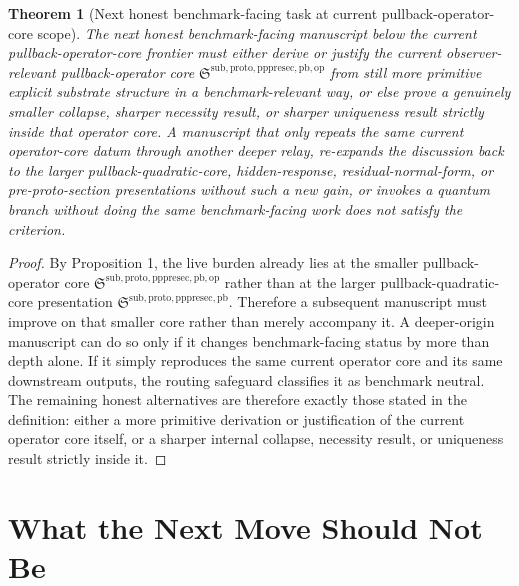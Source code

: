 \documentclass[11pt]{article}
\newcommand{\PrePreProtoSectionPullbackCore}{\mathfrak S^{\mathrm{sub,proto,pppresec,pb}}}
\newcommand{\PullbackOperatorCore}{\mathfrak S^{\mathrm{sub,proto,pppresec,pb,op}}}
\newtheorem{theorem}{Theorem}
\begin{document}
\begin{theorem}[Next honest benchmark-facing task at current pullback-operator-core scope]
The next honest benchmark-facing manuscript below the current pullback-operator-core frontier must either derive or justify the current observer-relevant pullback-operator core \(\PullbackOperatorCore\) from still more primitive explicit substrate structure in a benchmark-relevant way, or else prove a genuinely smaller collapse, sharper necessity result, or sharper uniqueness result strictly inside that operator core. A manuscript that only repeats the same current operator-core datum through another deeper relay, re-expands the discussion back to the larger pullback-quadratic-core, hidden-response, residual-normal-form, or pre-proto-section presentations without such a new gain, or invokes a quantum branch without doing the same benchmark-facing work does not satisfy the criterion.
\end{theorem}

\begin{proof}
By Proposition 1, the live burden already lies at the smaller pullback-operator core \(\PullbackOperatorCore\) rather than at the larger pullback-quadratic-core presentation \(\PrePreProtoSectionPullbackCore\). Therefore a subsequent manuscript must improve on that smaller core rather than merely accompany it. A deeper-origin manuscript can do so only if it changes benchmark-facing status by more than depth alone. If it simply reproduces the same current operator core and its same downstream outputs, the routing safeguard classifies it as benchmark neutral. The remaining honest alternatives are therefore exactly those stated in the definition: either a more primitive derivation or justification of the current operator core itself, or a sharper internal collapse, necessity result, or uniqueness result strictly inside it.
\end{proof}

\section{What the Next Move Should Not Be}
\end{document}
